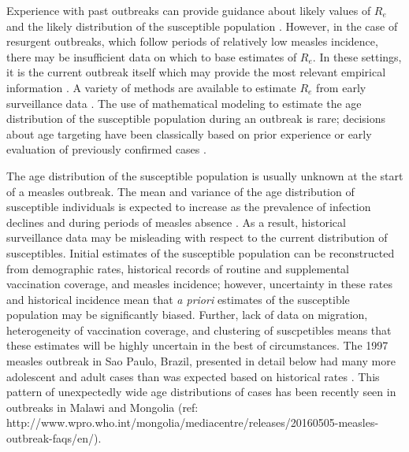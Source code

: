 Experience with past outbreaks can provide guidance about likely values of \(R_{e}\) \cite{Durrheim_2014} and the likely distribution of the
susceptible population \cite{Goodson_2011, 25803382}. However, in the case of resurgent outbreaks, which follow periods of relatively low
measles incidence, there may be insufficient data on which to base estimates of \(R_e\). In these settings, it is the current outbreak itself which
may provide the most relevant empirical information \cite{Durrheim_2014, Merl_2009, Shea_2014}. A variety of methods are available to estimate \(R_{e}\) from early surveillance data \cite{Durrheim_2014,Chiew_2013,Ferrari_2005,Lipsitch_2003} . The use of mathematical modeling to estimate the age distribution of the susceptible population during an outbreak is rare; decisions about age targeting have been classically based
on prior experience or early evaluation of previously confirmed cases \cite{Minetti_2013a}.

The age distribution of the susceptible population is usually unknown at the start of a measles outbreak. The mean and variance of the age
distribution of susceptible individuals is expected to increase as the prevalence of infection declines \cite{Goodson_2011, Ferrari_2013} and
during periods of measles absence \cite{Durrheim_2014}. As a result, historical surveillance data may be misleading with respect to the current
distribution of susceptibles. Initial estimates of the susceptible population can be reconstructed from demographic rates, historical
records of routine and supplemental vaccination coverage, and measles incidence\cite{Takahashi_2015}; however, uncertainty in these rates and historical incidence mean that \emph{a priori} estimates of the susceptible population may be significantly biased. Further, lack of data on migration, heterogeneity of vaccination coverage, and clustering of suscpetibles means that these estimates will be highly uncertain in the best of circumstances. The 1997 measles outbreak in Sao Paulo, Brazil, presented in detail below had many more adolescent and adult cases than
was expected based on historical rates \cite{Camargo_2000}. This pattern of unexpectedly wide age distributions of cases has been recently seen in
outbreaks in Malawi \cite{Minetti_2013} and Mongolia (ref: http://www.wpro.who.int/mongolia/mediacentre/releases/20160505-measles-outbreak-faqs/en/).

